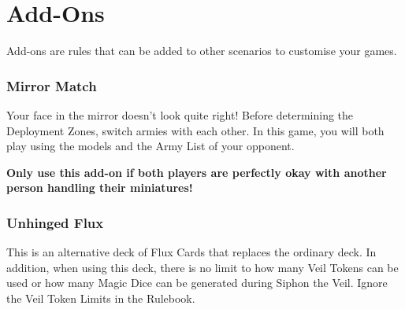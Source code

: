 \part*{Add-Ons}
\label{add_ons}

Add-ons are rules that can be added to other scenarios to customise your games.

\section*{Mirror Match}

Your face in the mirror doesn't look quite right! Before determining the Deployment Zones, switch armies with each other. In this game, you will both play using the models and the Army List of your opponent.

\textbf{Only use this add-on if both players are perfectly okay with another person handling their miniatures!}

\section*{Unhinged Flux}

This is an alternative deck of Flux Cards that replaces the ordinary deck. In addition, when using this deck, there is no limit to how many Veil Tokens can be used or how many Magic Dice can be generated during Siphon the Veil. Ignore the Veil Token Limits in the Rulebook.


